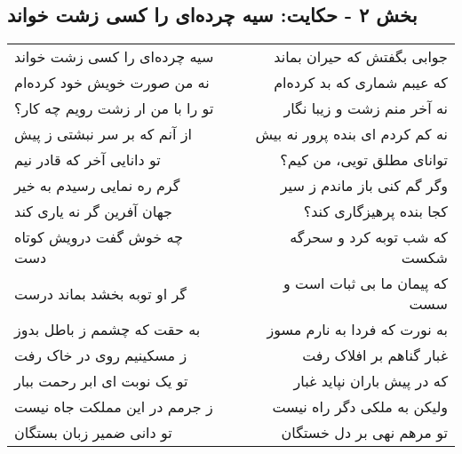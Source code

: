 \begin{center}
\section*{بخش ۲ - حکایت: سیه چرده‌ای را کسی زشت خواند}
\label{sec:002}
\begin{longtable}{l p{0.5cm} r}
سیه چرده‌ای را کسی زشت خواند
&&
جوابی بگفتش که حیران بماند
\\
نه من صورت خویش خود کرده‌ام
&&
که عیبم شماری که بد کرده‌ام
\\
تو را با من ار زشت رویم چه کار؟
&&
نه آخر منم زشت و زیبا نگار
\\
از آنم که بر سر نبشتی ز پیش
&&
نه کم کردم ای بنده پرور نه بیش
\\
تو دانایی آخر که قادر نیم
&&
توانای مطلق تویی، من کیم؟
\\
گرم ره نمایی رسیدم به خیر
&&
وگر گم کنی باز ماندم ز سیر
\\
جهان آفرین گر نه یاری کند
&&
کجا بنده پرهیزگاری کند؟
\\
چه خوش گفت درویش کوتاه دست
&&
که شب توبه کرد و سحرگه شکست
\\
گر او توبه بخشد بماند درست
&&
که پیمان ما بی ثبات است و سست
\\
به حقت که چشمم ز باطل بدوز
&&
به نورت که فردا به نارم مسوز
\\
ز مسکینیم روی در خاک رفت
&&
غبار گناهم بر افلاک رفت
\\
تو یک نوبت ای ابر رحمت ببار
&&
که در پیش باران نپاید غبار
\\
ز جرمم در این مملکت جاه نیست
&&
ولیکن به ملکی دگر راه نیست
\\
تو دانی ضمیر زبان بستگان
&&
تو مرهم نهی بر دل خستگان
\\
\end{longtable}
\end{center}
